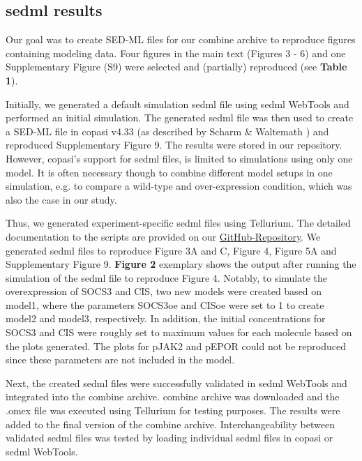 \subsection*{\acf{sedml} results}

Our goal was to create SED-ML files for our \acs{combine} archive to reproduce figures containing modeling data. Four figures in the main text (Figures 3 - 6) and one Supplementary Figure (S9) were selected and (partially) reproduced (see \textbf{Table 1}).

Initially, we generated a default simulation \ac{sedml} file using \ac{sedml} WebTools and performed an initial simulation. The generated \ac{sedml} file was then used to create a SED-ML file in \ac{copasi} v4.33 (as described by Scharm \& Waltemath \cite{combine}) and reproduced Supplementary Figure 9. The results were stored in our repository. However, \ac{copasi}'s support for \ac{sedml} files, is limited to simulations using only one model. It is often necessary though to combine different model setups in one simulation, e.g. to compare a wild-type and over-expression condition, which was also the case in our study.

Thus, we generated experiment-specific \ac{sedml} files using Tellurium. The detailed documentation to the scripts are provided on our \hyperlink{https://github.com/ahodelin/Bachmann_Archive/wiki/SEDML_Tellurium}{GitHub-Repository}. We generated \ac{sedml} files to reproduce Figure 3A and C, Figure 4, Figure 5A and Supplementary Figure 9. \textbf{Figure 2} exemplary shows the output after running the simulation of the \ac{sedml} file to reproduce Figure 4. Notably, to simulate the overexpression of SOCS3 and CIS, two new models were created based on model1, where the parameters SOCS3oe and CISoe were set to 1 to create model2 and model3, respectively. In addition, the initial concentrations for SOCS3 and CIS were roughly set to maximum values for each molecule based on the plots generated. The plots for pJAK2 and pEPOR could not be reproduced since these parameters are not included in the model.

Next, the created \ac{sedml} files were successfully validated in \ac{sedml} WebTools and integrated into the \ac{combine} archive. \ac{combine} archive was downloaded and the .omex file was executed using Tellurium for testing purposes. The results were added to the final version of the \ac{combine} archive. Interchangeability between validated \ac{sedml} files was tested by loading individual \ac{sedml} files in \ac{copasi} or \ac{sedml} WebTools. 

